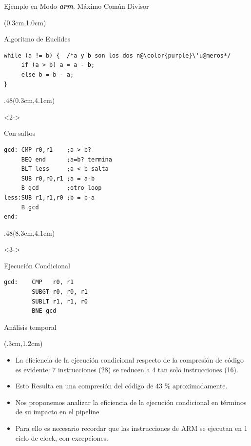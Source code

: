 \documentclass[usenames,table,dvipsnames,aspectratio=169]{beamer}
\newcommand{\arm}{\textbf{\textit{arm}}}
\begin{document}
\begin{frame}[fragile]{Ejemplo en Modo \arm. Máximo Común Divisor}
 \begin{textblock*}{\textwidth}(0.3cm,1.0cm)
  \begin{block}{Algoritmo de Euclides}
   \lstset{language=[ansi]C,}
   \begin{lstlisting}[escapechar=\@,]
while (a != b) {  /*a y b son los dos n@\color{purple}\'u@meros*/
	 if (a > b) a = a - b;
	 else b = b - a;
}
   \end{lstlisting}
  \end{block}
 \end{textblock*}
 \begin{textblock*}{.48\textwidth}(0.3cm,4.1cm)
  \begin{onlyenv}<2->
   \begin{block}{Con saltos}
    \lstset{language=[ARM]Assembler, basicstyle=\scriptsize,}
    \begin{lstlisting}[escapechar=\@,]
gcd: CMP r0,r1    ;a > b?
     BEQ end      ;a=b? termina
     BLT less     ;a < b salta
     SUB r0,r0,r1 ;a = a-b
     B gcd        ;otro loop
less:SUB r1,r1,r0 ;b = b-a
     B gcd
end:
    \end{lstlisting}
   \end{block}
  \end{onlyenv}
 \end{textblock*}
 \begin{textblock*}{.48\textwidth}(8.3cm,4.1cm)
  \begin{onlyenv}<3->
   \begin{block}{Ejecución Condicional}
    \begin{lstlisting}[escapechar=\@,]
gcd:    CMP   r0, r1
        SUBGT r0, r0, r1
        SUBLT r1, r1, r0
        BNE gcd
    \end{lstlisting}
   \end{block}
  \end{onlyenv}
 \end{textblock*}
\end{frame}

\begin{frame}[t]{Análisis temporal}
  \begin{textblock*}{\textwidth}(.3cm,1.2cm) 
    \begin{itemize}[<+(1)->] \justifying \parskip .2cm
  \item La eficiencia de la ejecución condicional respecto de la compresión de código es evidente: 7 instrucciones (\SI{28}{\byte}) se reducen a 4 tan solo instrucciones (\SI{16}{\byte}).
  \item Esto Resulta en una compresión del código de 43 \% aproximadamente.
  \item Nos proponemos analizar la eficiencia de la ejecución condicional en términos de su impacto en el pipeline
  \item Para ello es necesario recordar que las instrucciones de ARM se ejecutan en 1 ciclo de clock, con excepciones.
 \end{itemize}
\end{textblock*}
\end{frame}
  
\end{document}
